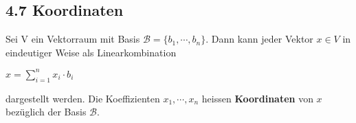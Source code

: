 \subsection{4.7 Koordinaten}{
Sei V ein Vektorraum mit Basis $\mathcal{B} = \{ b_1, \dotsm, b_n \}$. Dann kann jeder Vektor $x \in V$ in eindeutiger Weise als Linearkombination
\vspace{1pt}
\begin{center}
$x = \sum\nolimits_{i = 1}^{n} x_i \cdot b_i$
\end{center}
\vspace{4pt}
dargestellt werden. Die Koeffizienten $x_1, \dotsm, x_n$ heissen \textbf{Koordinaten} von $x$ bezüglich der Basis $\mathcal{B}$.

}
\WhiteSpace